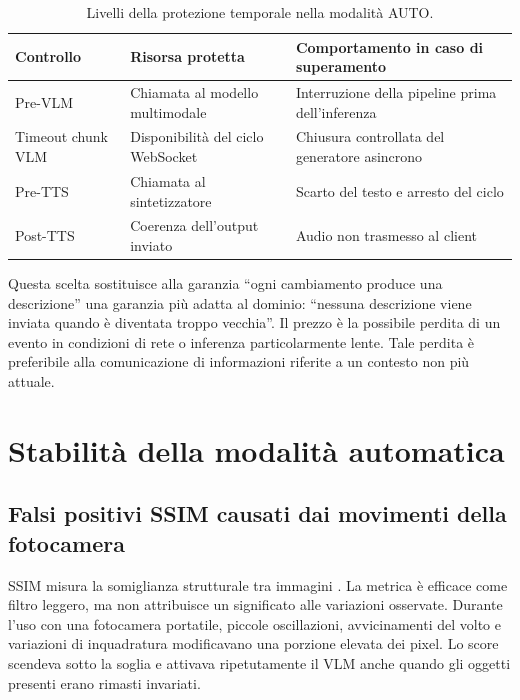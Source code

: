 \begin{table}[H]
    \centering
    \begingroup
    \small
    \renewcommand{\arraystretch}{1.28}
    \setlength{\tabcolsep}{4pt}
    \begin{tabular}{|
        p{}|
        p{}|
        p{}|
    }
        \hline
        \rowcolor{SlateGray!18}
        \textbf{Controllo} & \textbf{Risorsa protetta} &
        \textbf{Comportamento in caso di superamento} \\
        \hline
        \rowcolor{AliceBlue!32}
        Pre-VLM & Chiamata al modello multimodale &
        Interruzione della pipeline prima dell'inferenza \\
        \hline
        Timeout chunk VLM & Disponibilità del ciclo WebSocket &
        Chiusura controllata del generatore asincrono \\
        \hline
        \rowcolor{AliceBlue!32}
        Pre-TTS & Chiamata al sintetizzatore &
        Scarto del testo e arresto del ciclo \\
        \hline
        Post-TTS & Coerenza dell'output inviato &
        Audio non trasmesso al client \\
        \hline
    \end{tabular}
    \endgroup
    \caption{Livelli della protezione temporale nella modalità AUTO.}
    \label{tab:freshness-guard}
\end{table}

Questa scelta sostituisce alla garanzia ``ogni cambiamento produce una
descrizione'' una garanzia più adatta al dominio: ``nessuna descrizione viene
inviata quando è diventata troppo vecchia''. Il prezzo è la possibile perdita
di un evento in condizioni di rete o inferenza particolarmente lente. Tale
perdita è preferibile alla comunicazione di informazioni riferite a un
contesto non più attuale.

\section{Stabilità della modalità automatica}
\label{sec:problemi-auto}

\subsection{Falsi positivi SSIM causati dai movimenti della fotocamera}
\label{subsec:problemi-dondolio}

SSIM misura la somiglianza strutturale tra immagini
\cite{wang2004ssim}. La metrica è efficace come filtro leggero, ma non
attribuisce un significato alle variazioni osservate. Durante l'uso con una
fotocamera portatile, piccole oscillazioni, avvicinamenti del volto e
variazioni di inquadratura modificavano una porzione elevata dei pixel. Lo
score scendeva sotto la soglia e attivava ripetutamente il VLM anche quando
gli oggetti presenti erano rimasti invariati.

